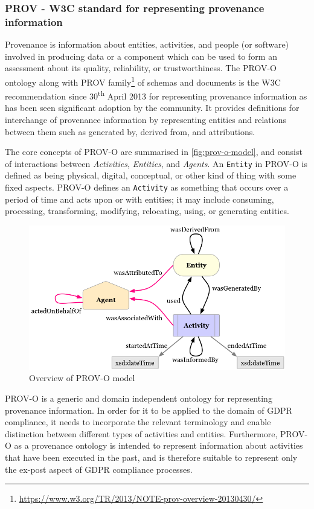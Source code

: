 \subsubsection{PROV - W3C standard for representing provenance information}
Provenance is information about entities, activities, and people (or software)
involved in producing data or a component which can be used to form an
assessment about its quality, reliability, or trustworthiness. The PROV-O ontology \cite{lebo_prov-o_2013} along with PROV family\footnote{\url{https://www.w3.org/TR/2013/NOTE-prov-overview-20130430/}} of schemas and documents is the W3C recommendation since 30\textsuperscript{th} April 2013 for representing provenance information as has been seen significant adoption by the community.
It provides definitions for interchange of provenance information by representing entities
and relations between them such as generated by, derived from, and attributions.

The core concepts of PROV-O are summarised in \autoref{fig:prov-o-model}, and consist of interactions between \textit{Activities}, \textit{Entities}, and \textit{Agents}.
An \texttt{Entity} in PROV-O is defined as being physical, digital, conceptual, or other
kind of thing with some fixed aspects. PROV-O defines an \texttt{Activity} as something
that occurs over a period of time and acts upon or with entities; it may include
consuming, processing, transforming, modifying, relocating, using, or generating
entities.
\begin{figure}[htbp]
    \centering
    \includegraphics[width=0.8\linewidth]{img/prov-o-model.png}
    \caption{Overview of PROV-O model \cite{lebo_prov-o_2013}}
    \label{fig:prov-o-model}
\end{figure}

PROV-O is a generic and domain independent ontology for representing provenance information.
In order for it to be applied to the domain of GDPR compliance, it needs to incorporate the relevant terminology and enable distinction between different types of activities and entities.
Furthermore, PROV-O as a provenance ontology is intended to represent information about activities that have been executed in the past, and is therefore suitable to represent only the ex-post aspect of GDPR compliance processes.

